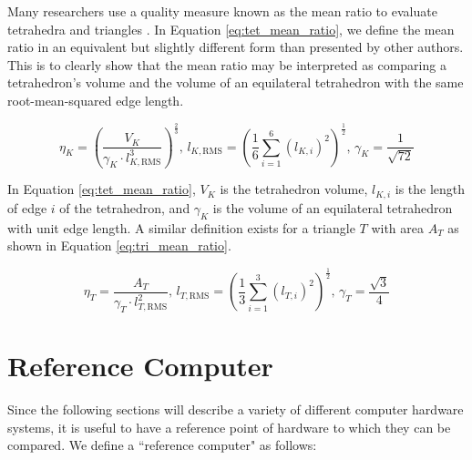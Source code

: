 Many researchers use a quality measure known as the mean ratio
to evaluate tetrahedra and triangles
\cite{liu1994relationship,loseille2015parallel,compere2010mesh,
li20053d}.
In Equation \ref{eq:tet_mean_ratio}, we define the mean ratio
in an equivalent but slightly different form than presented by other
authors.
This is to clearly show that the mean ratio may be interpreted
as comparing a tetrahedron's volume and the volume of
an equilateral tetrahedron with the same root-mean-squared edge length.

\begin{equation} \label{eq:tet_mean_ratio}
\eta_K = \left(\frac{V_K}{\gamma_K\cdot l_{K,\text{RMS}}^3}\right)^{\frac23},\,
l_{K,\text{RMS}}=\left(\frac16\sum_{i=1}^6 \left(l_{K,i}\right)^2\right)^\frac12, \,
\gamma_K = \frac{1}{\sqrt{72}}
\end{equation}

In Equation \ref{eq:tet_mean_ratio},
$V_K$ is the tetrahedron volume, $l_{K,i}$ is the
length of edge $i$ of the tetrahedron, and $\gamma_K$ is the volume
of an equilateral tetrahedron with unit edge length.
A similar definition exists for a triangle $T$
with area $A_T$ as shown in Equation \ref{eq:tri_mean_ratio}.

\begin{equation} \label{eq:tri_mean_ratio}
\eta_T = \frac{A_T}{\gamma_T\cdot l_{T,\text{RMS}}^2},\,
l_{T,\text{RMS}}=\left(\frac13\sum_{i=1}^3 \left(l_{T,i}\right)^2\right)^\frac12, \,
\gamma_T = \frac{\sqrt{3}}{4}
\end{equation}

\section{Reference Computer}
\label{sec:ref_comp}

Since the following sections will describe a variety
of different computer hardware systems, it is useful to have a reference
point of hardware to which they can be compared.
We define a ``reference computer" as follows:


